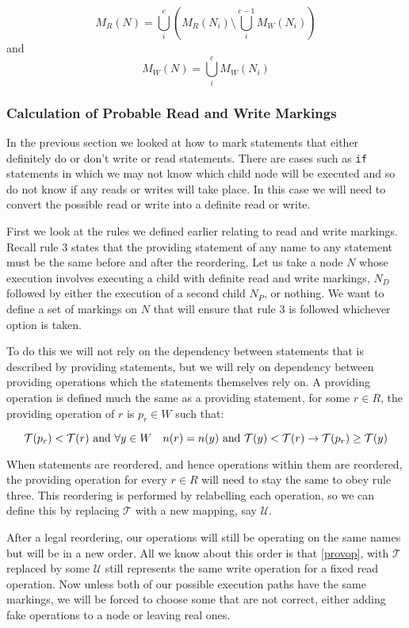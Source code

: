 \documentclass[twoside,a4paper]{report}
\begin{document}
$$M_R(N) = \bigcup_i^c (M_R(N_i) \setminus \bigcup_i^{c-1} M_W(N_i))$$
and
$$M_W(N) = \bigcup_i^c M_W(N_i)$$

\subsubsection{Calculation of Probable Read and Write Markings}

In the previous section we looked at how to mark statements that either definitely do or don't write or read statements. There are cases such as
\texttt{if} statements in which we may not know which child node will be executed and so do not know if any reads or writes will take place. In this
case we will need to convert the possible read or write into a definite read or write.

First we look at the rules we defined earlier relating to read and write markings. Recall rule 3 states that the providing statement of
any name to any statement must be the same before and after the reordering. Let us take a node $N$ whose execution involves executing a
child with definite read and write markings, $N_D$ followed by either the execution of a second child $N_P$, or nothing. We want to define
a set of markings on $N$ that will ensure that rule 3 is followed whichever option is taken.

To do this we will not rely on the dependency between statements that is described by providing statements, but we will rely on dependency
between providing operations which the statements themselves rely on. A providing operation is defined much the same as a providing statement,
for some $r \in R$, the providing operation of $r$ is $p_r \in W$ such that:

\begin{equation} \label{provop}
\mathcal{T}(p_r) < \mathcal{T}(r) \text{ and } \\
\forall y \in W \quad n(r) = n(y) \text{ and } \mathcal{T}(y) < \mathcal{T}(r) \rightarrow \mathcal{T}(p_r) \ge \mathcal{T}(y)
\end{equation}

When statements are reordered, and hence operations within them are reordered, the providing operation for every $r \in R$ will need to stay the same to
obey rule three. This reordering is performed by relabelling each operation, so we can define this by replacing $\mathcal{T}$ with a new mapping, say
$\mathcal{U}$.

After a legal reordering, our operations will still be operating on the same names but will be in a new order. All we know about this order is that
\eqref{provop}, with $\mathcal{T}$ replaced by some $\mathcal{U}$ still represents the same write operation for a fixed read operation. Now unless
both of our possible execution paths have the same markings, we will be forced to choose some that are not correct, either adding fake operations
to a node or leaving real ones.
\end{document}
